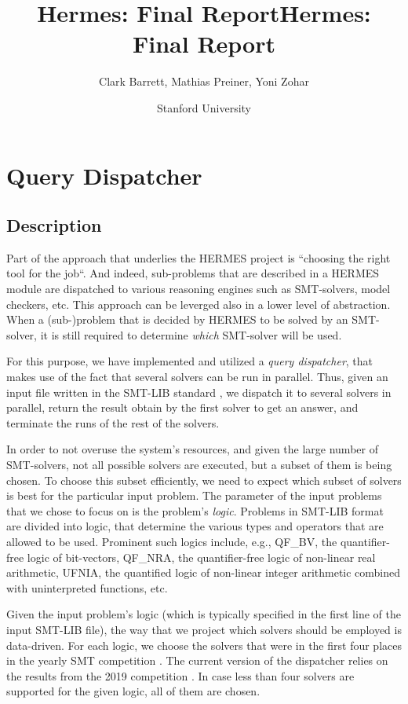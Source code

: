 \documentclass{article}
\title{Hermes: Final Report}
\title{Hermes: Final Report}
\author{Clark Barrett, Mathias Preiner, Yoni Zohar
\date{Stanford University}}
\begin{document}
\maketitle

\section{Query Dispatcher}
\subsection{Description}
Part of the approach that underlies the HERMES project is
``choosing the right tool for the job``.
And indeed, sub-problems that are described in
a HERMES module are dispatched to various
reasoning engines such as SMT-solvers, model checkers, etc.
This approach can be leverged also in a lower level of abstraction.
When a (sub-)problem that is decided by HERMES to be solved by an SMT-solver, it is still
required to determine \emph{which} SMT-solver will be used.

For this purpose, we have implemented and utilized a
{\em query dispatcher}, that
makes use of the fact that several solvers
can be run in parallel.
Thus, given an input file written in the SMT-LIB standard \cite{SMTLib2010}, we dispatch it to several solvers in parallel,
return the result obtain by the first solver to get an answer, and
terminate the runs of the rest of the solvers.

In order to not overuse the system's resources, and given the large number of SMT-solvers,
not all possible solvers are executed, but a subset of them is being chosen.
To choose this subset efficiently, we need to expect which subset of solvers is best
for the particular input problem.
The parameter of the input problems that we chose to focus on is the problem's {\em logic}.
Problems in SMT-LIB format are divided into logic, that determine the various types and operators
that are allowed to be used.
Prominent such logics include, e.g.,
QF\_BV, the quantifier-free logic of bit-vectors,
QF\_NRA, the quantifier-free logic of non-linear real arithmetic,
UFNIA, the quantified logic of non-linear integer arithmetic combined with uninterpreted functions, etc.

Given the input problem's logic (which is typically specified in the first line of the input SMT-LIB file), the way that we project which solvers should be employed is data-driven.
For each logic, we choose the solvers that were in the first four places in
the yearly SMT competition \cite{DBLP:journals/jsat/WeberCDHNR19}.
The current version of the dispatcher relies on the results from the 2019 competition \cite{smtcomp2019}.
In case less than four solvers are supported for the given logic, all of them are chosen.
\end{document}
